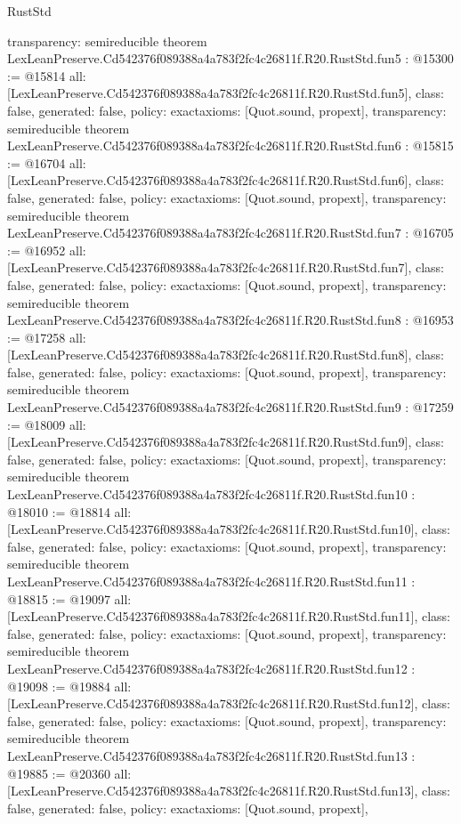 \begin{lexlean}{RustStd}
\begin{coremodule}
{  transparency: semireducible
}
theorem LexLeanPreserve.Cd542376f089388a4a783f2fc4c26811f.R20.RustStd.fun5 : @15300 := @15814 {
  all: [LexLeanPreserve.Cd542376f089388a4a783f2fc4c26811f.R20.RustStd.fun5],
  class: false,
  generated: false,
  policy: exact{axioms: [Quot.sound, propext]},
  transparency: semireducible
}
theorem LexLeanPreserve.Cd542376f089388a4a783f2fc4c26811f.R20.RustStd.fun6 : @15815 := @16704 {
  all: [LexLeanPreserve.Cd542376f089388a4a783f2fc4c26811f.R20.RustStd.fun6],
  class: false,
  generated: false,
  policy: exact{axioms: [Quot.sound, propext]},
  transparency: semireducible
}
theorem LexLeanPreserve.Cd542376f089388a4a783f2fc4c26811f.R20.RustStd.fun7 : @16705 := @16952 {
  all: [LexLeanPreserve.Cd542376f089388a4a783f2fc4c26811f.R20.RustStd.fun7],
  class: false,
  generated: false,
  policy: exact{axioms: [Quot.sound, propext]},
  transparency: semireducible
}
theorem LexLeanPreserve.Cd542376f089388a4a783f2fc4c26811f.R20.RustStd.fun8 : @16953 := @17258 {
  all: [LexLeanPreserve.Cd542376f089388a4a783f2fc4c26811f.R20.RustStd.fun8],
  class: false,
  generated: false,
  policy: exact{axioms: [Quot.sound, propext]},
  transparency: semireducible
}
theorem LexLeanPreserve.Cd542376f089388a4a783f2fc4c26811f.R20.RustStd.fun9 : @17259 := @18009 {
  all: [LexLeanPreserve.Cd542376f089388a4a783f2fc4c26811f.R20.RustStd.fun9],
  class: false,
  generated: false,
  policy: exact{axioms: [Quot.sound, propext]},
  transparency: semireducible
}
theorem LexLeanPreserve.Cd542376f089388a4a783f2fc4c26811f.R20.RustStd.fun10 : @18010 := @18814 {
  all: [LexLeanPreserve.Cd542376f089388a4a783f2fc4c26811f.R20.RustStd.fun10],
  class: false,
  generated: false,
  policy: exact{axioms: [Quot.sound, propext]},
  transparency: semireducible
}
theorem LexLeanPreserve.Cd542376f089388a4a783f2fc4c26811f.R20.RustStd.fun11 : @18815 := @19097 {
  all: [LexLeanPreserve.Cd542376f089388a4a783f2fc4c26811f.R20.RustStd.fun11],
  class: false,
  generated: false,
  policy: exact{axioms: [Quot.sound, propext]},
  transparency: semireducible
}
theorem LexLeanPreserve.Cd542376f089388a4a783f2fc4c26811f.R20.RustStd.fun12 : @19098 := @19884 {
  all: [LexLeanPreserve.Cd542376f089388a4a783f2fc4c26811f.R20.RustStd.fun12],
  class: false,
  generated: false,
  policy: exact{axioms: [Quot.sound, propext]},
  transparency: semireducible
}
theorem LexLeanPreserve.Cd542376f089388a4a783f2fc4c26811f.R20.RustStd.fun13 : @19885 := @20360 {
  all: [LexLeanPreserve.Cd542376f089388a4a783f2fc4c26811f.R20.RustStd.fun13],
  class: false,
  generated: false,
  policy: exact{axioms: [Quot.sound, propext]},
}
\end{coremodule}
\end{lexlean}

